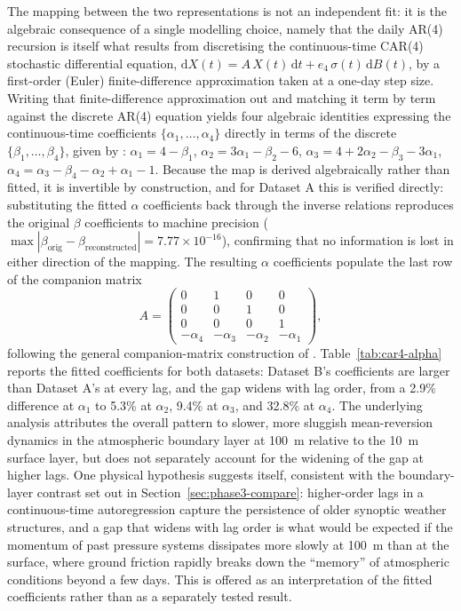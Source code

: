 \documentclass[11pt, a4paper, twoside]{article}
\begin{document}
The mapping between the two representations is not an independent fit: it is the algebraic consequence of a single modelling choice, namely that the daily AR(4) recursion is itself what results from discretising the continuous-time CAR(4) stochastic differential equation, $\mathrm dX(t) = A\,X(t)\,\mathrm dt + e_4\,\sigma(t)\,\mathrm dB(t)$, by a first-order (Euler) finite-difference approximation taken at a one-day step size. Writing that finite-difference approximation out and matching it term by term against the discrete AR(4) equation yields four algebraic identities expressing the continuous-time coefficients $\{\alpha_1,\dots,\alpha_4\}$ directly in terms of the discrete $\{\beta_1,\dots,\beta_4\}$, given by \citet{BenthSaltyteBenth2009}: $\alpha_1 = 4-\beta_1$, $\alpha_2 = 3\alpha_1 - \beta_2 - 6$, $\alpha_3 = 4 + 2\alpha_2 - \beta_3 - 3\alpha_1$, $\alpha_4 = \alpha_3 - \beta_4 - \alpha_2 + \alpha_1 - 1$. Because the map is derived algebraically rather than fitted, it is invertible by construction, and for Dataset A this is verified directly: substituting the fitted $\alpha$ coefficients back through the inverse relations reproduces the original $\beta$ coefficients to machine precision ($\max|\beta_{\text{orig}} - \beta_{\text{reconstructed}}| = 7.77\times 10^{-16}$), confirming that no information is lost in either direction of the mapping. The resulting $\alpha$ coefficients populate the last row of the companion matrix
\begin{equation}
A = \begin{pmatrix} 0 & 1 & 0 & 0 \\ 0 & 0 & 1 & 0 \\ 0 & 0 & 0 & 1 \\ -\alpha_4 & -\alpha_3 & -\alpha_2 & -\alpha_1 \end{pmatrix},
\end{equation}
following the general companion-matrix construction of \citet{BrockwellMarquardt2005}. Table~\ref{tab:car4-alpha} reports the fitted coefficients for both datasets: Dataset B's coefficients are larger than Dataset A's at every lag, and the gap widens with lag order, from a 2.9\% difference at $\alpha_1$ to 5.3\% at $\alpha_2$, 9.4\% at $\alpha_3$, and 32.8\% at $\alpha_4$. The underlying analysis attributes the overall pattern to slower, more sluggish mean-reversion dynamics in the atmospheric boundary layer at 100~m relative to the 10~m surface layer, but does not separately account for the widening of the gap at higher lags. One physical hypothesis suggests itself, consistent with the boundary-layer contrast set out in Section~\ref{sec:phase3-compare}: higher-order lags in a continuous-time autoregression capture the persistence of older synoptic weather structures, and a gap that widens with lag order is what would be expected if the momentum of past pressure systems dissipates more slowly at 100~m than at the surface, where ground friction rapidly breaks down the ``memory'' of atmospheric conditions beyond a few days. This is offered as an interpretation of the fitted coefficients rather than as a separately tested result.
\end{document}
